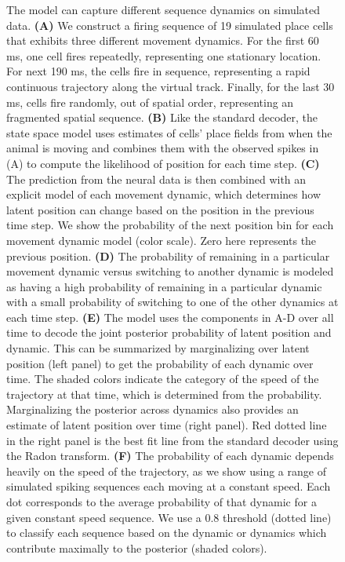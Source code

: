\documentclass[9pt,lineno]{elife}
\begin{document}
\begin{figure}
\caption{The model can capture different sequence dynamics on simulated data. \textbf{(A)} We construct a firing sequence of 19 simulated place cells that exhibits three different movement dynamics. For the first 60 ms, one cell fires repeatedly, representing one stationary location. For next 190 ms, the cells fire in sequence, representing a rapid continuous trajectory along the virtual track. Finally, for the last 30 ms, cells fire randomly, out of spatial order, representing an fragmented spatial sequence. \textbf{(B)} Like the standard decoder, the state space model uses estimates of cells' place fields from when the animal is moving and combines them with the observed spikes in (A) to compute the likelihood of position for each time step. \textbf{(C)} The prediction from the neural data is then combined with an explicit model of each movement dynamic, which determines how latent position can change based on the position in the previous time step. We show the probability of the next position bin for each movement dynamic model (color scale). Zero here represents the previous position. \textbf{(D)} The probability of remaining in a particular movement dynamic versus switching to another dynamic is modeled as having a high probability of remaining in a particular dynamic with a small probability of switching to one of the other dynamics at each time step. \textbf{(E)} The model uses the components in A-D over all time to decode the joint posterior probability of latent position and dynamic. This can be summarized by marginalizing over latent position (left panel) to get the probability of each dynamic over time. The shaded colors indicate the category of the speed of the trajectory at that time, which is determined from the probability. Marginalizing the posterior across dynamics also provides an estimate of latent position over time (right panel). Red dotted line in the right panel is the best fit line from the standard decoder using the Radon transform. \textbf{(F)} The probability of each dynamic depends heavily on the speed of the trajectory, as we show using a range of simulated spiking sequences each moving at a constant speed. Each dot corresponds to the average probability of that dynamic for a given constant speed sequence. We use a 0.8 threshold (dotted line) to classify each sequence based on the dynamic or dynamics which contribute maximally to the posterior (shaded colors).
}
\label{fig:1}

\end{figure}
\end{document}

